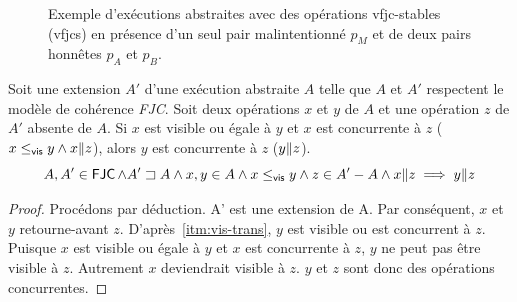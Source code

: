 \begin{figure}[htb]
\begin{subfigure}{\linewidth}
\caption{}\label{fig:vfjcs-one-malicious-3}
\end{subfigure}
\caption[Stabilité \acl{VFJC} en présence d'un pair malintentionné]{Exemple d'exécutions abstraites avec des opérations vfjc-stables (vfjcs) en présence d'un seul pair malintentionné $p_M$ et de deux pairs honnêtes $p_A$ et $p_B$.}\label{fig:vfjcs-one-malicious}
\end{figure}

\begin{proposition}\label{th:concur-triad}
Soit une extension $A'$ d'une exécution abstraite $A$ telle que $A$ et $A'$ respectent le modèle de cohérence \emph{FJC}.
Soit deux opérations $x$ et $y$ de $A$ et une opération $z$ de $A'$ absente de $A$.
Si $x$ est visible ou égale à $y$ et $x$ est concurrente à $z$ ($x \leq_{\operatorname{\mathsf{vis}}} y \land x \| z$), alors $y$ est concurrente à $z$ ($y \| z$).
\begin{equation*}
    A, A' \in \operatorname{\mathsf{FJC}} \land A' \sqsupset A \land x, y \in A \land x \leq_{\operatorname{\mathsf{vis}}} y \land z \in A'- A \land x \| z \implies y \| z
\end{equation*}
\end{proposition}

\begin{proof}
Procédons par déduction.
A' est une extension de A.
Par conséquent, $x$ et $y$ retourne-avant $z$.
D'après~\ref{itm:vis-trans}, $y$ est visible ou est concurrent à $z$.
Puisque $x$ est visible ou égale à $y$ et $x$ est concurrente à $z$, $y$ ne peut pas être visible à $z$.
Autrement $x$ deviendrait visible à $z$.
$y$ et $z$ sont donc des opérations concurrentes.
\end{proof}


